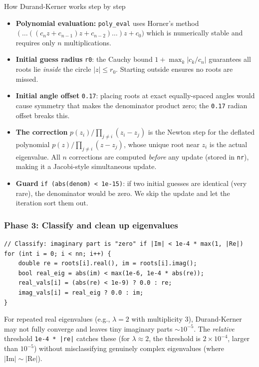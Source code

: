 \documentclass[12pt, a4paper]{article}
\newcommand{\code}[1]{\texttt{\small#1}}
\newcommand{\fn}[1]{\texttt{\small\color{funcgreen}#1}}
\begin{document}
\begin{flowbox}{How Durand-Kerner works step by step}
\begin{itemize}[noitemsep]
  \item \textbf{Polynomial evaluation:} \fn{poly\_eval} uses Horner's method
        $(\ldots((c_n z + c_{n-1})z + c_{n-2})\ldots)z + c_0)$ which is
        numerically stable and requires only $n$ multiplications.
  \item \textbf{Initial guess radius} \code{r0}: the Cauchy bound
        $1 + \max_k |c_k / c_n|$ guarantees all roots lie \emph{inside} the
        circle $|z| \leq r_0$.  Starting outside ensures no roots are missed.
  \item \textbf{Initial angle offset} \code{0.17}: placing roots at exact
        equally-spaced angles would cause symmetry that makes the denominator
        product zero; the \code{0.17} radian offset breaks this.
  \item \textbf{The correction} $p(z_i) / \prod_{j\neq i}(z_i - z_j)$ is the
        Newton step for the deflated polynomial $p(z) / \prod_{j \neq i}
        (z - z_j)$, whose unique root near $z_i$ is the actual eigenvalue.
        All $n$ corrections are computed \emph{before} any update (stored in
        \code{nr}), making it a Jacobi-style simultaneous update.
  \item \textbf{Guard} \code{if (abs(denom) < 1e-15)}: if two initial guesses
        are identical (very rare), the denominator would be zero.  We skip the
        update and let the iteration sort them out.
\end{itemize}
\end{flowbox}

\subsubsection{Phase 3: Classify and clean up eigenvalues}

\begin{lstlisting}
// Classify: imaginary part is "zero" if |Im| < 1e-4 * max(1, |Re|)
for (int i = 0; i < nn; i++) {
    double re = roots[i].real(), im = roots[i].imag();
    bool real_eig = abs(im) < max(1e-6, 1e-4 * abs(re));
    real_vals[i] = (abs(re) < 1e-9) ? 0.0 : re;
    imag_vals[i] = real_eig ? 0.0 : im;
}
\end{lstlisting}

For repeated real eigenvalues (e.g., $\lambda = 2$ with multiplicity 3),
Durand-Kerner may not fully converge and leaves tiny imaginary parts $\sim
10^{-5}$.  The \emph{relative} threshold \code{1e-4 * |re|} catches these
(for $\lambda \approx 2$, the threshold is $2 \times 10^{-4}$, larger than
$10^{-5}$) without misclassifying genuinely complex eigenvalues (where
$|\text{Im}| \sim |\text{Re}|$).
\end{document}
